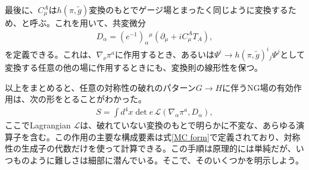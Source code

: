 最後に、$C_\mu^A$は$h(\pi, \tilde g)$変換のもとでゲージ場とまったく同じように変換するため、と呼ぶ。これを用いて、共変微分
%
\begin{align}
	D_\alpha = (e^{-1})_\alpha{}^\mu (\partial_\mu + i C_\mu^A T_A), 
\end{align}
% 
を定義できる。これは、$\nabla_\nu \pi^a$に作用するとき、あるいは$\Psi^i \to h(\pi, \tilde g)^i{}_j \Psi^j$として変換する任意の他の場に作用するときにも、変換則の線形性を保つ。

以上をまとめると、任意の対称性の破れのパターン$G \to H$に伴うNG場の有効作用は、次の形をとることがわかった。
%
\begin{align} \label{coset effective action}
	S = \int d^4 x \det e \, \mathcal{L} (\nabla_\alpha \pi^a, D_\alpha) ,
\end{align}
%
ここでLagrangian $\mathcal{L}$は、破れていない変換のもとで明らかに不変な、あらゆる演算子を含む。この作用の主要な構成要素は式\eqref{MC form}で定義されており、対称性の生成子の代数だけを使って計算できる。この手順は原理的には単純だが、いつものように難しさは細部に潜んでいる。そこで、そのいくつかを明示しよう。
%
